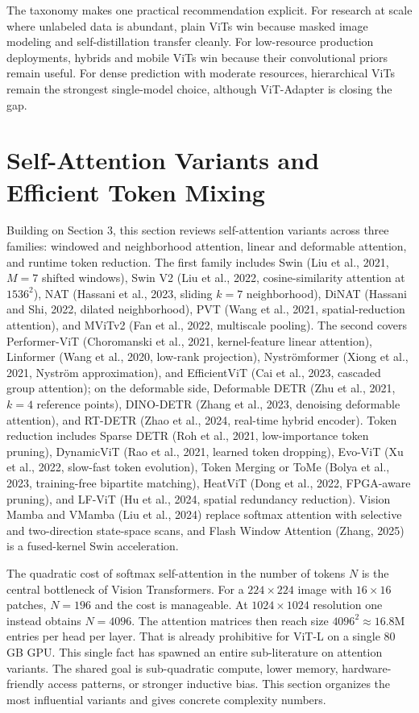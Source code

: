 \documentclass{article}
\begin{document}
The taxonomy makes one practical recommendation explicit. For research at scale where unlabeled data is abundant, plain ViTs win because masked image modeling and self-distillation transfer cleanly. For low-resource production deployments, hybrids and mobile ViTs win because their convolutional priors remain useful. For dense prediction with moderate resources, hierarchical ViTs remain the strongest single-model choice, although ViT-Adapter is closing the gap.

\section{Self-Attention Variants and Efficient Token Mixing}\label{self-attention-variants-and-efficient-token-mixing}

Building on Section 3, this section reviews self-attention variants across three families: windowed and neighborhood attention, linear and deformable attention, and runtime token reduction. The first family includes Swin (Liu et al., 2021, \(M{=}7\) shifted windows), Swin V2 (Liu et al., 2022, cosine-similarity attention at \(1536^2\)), NAT (Hassani et al., 2023, sliding \(k{=}7\) neighborhood), DiNAT (Hassani and Shi, 2022, dilated neighborhood), PVT (Wang et al., 2021, spatial-reduction attention), and MViTv2 (Fan et al., 2022, multiscale pooling). The second covers Performer-ViT (Choromanski et al., 2021, kernel-feature linear attention), Linformer (Wang et al., 2020, low-rank projection), Nyströmformer (Xiong et al., 2021, Nyström approximation), and EfficientViT (Cai et al., 2023, cascaded group attention); on the deformable side, Deformable DETR (Zhu et al., 2021, \(k{=}4\) reference points), DINO-DETR (Zhang et al., 2023, denoising deformable attention), and RT-DETR (Zhao et al., 2024, real-time hybrid encoder). Token reduction includes Sparse DETR (Roh et al., 2021, low-importance token pruning), DynamicViT (Rao et al., 2021, learned token dropping), Evo-ViT (Xu et al., 2022, slow-fast token evolution), Token Merging or ToMe (Bolya et al., 2023, training-free bipartite matching), HeatViT (Dong et al., 2022, FPGA-aware pruning), and LF-ViT (Hu et al., 2024, spatial redundancy reduction). Vision Mamba \citep{zhu2024visionmambaefficie} and VMamba (Liu et al., 2024) replace softmax attention with selective and two-direction state-space scans, and Flash Window Attention (Zhang, 2025) is a fused-kernel Swin acceleration.

The quadratic cost of softmax self-attention in the number of tokens \(N\) is the central bottleneck of Vision Transformers. For a \(224 \times 224\) image with \(16 \times 16\) patches, \(N = 196\) and the cost is manageable. At \(1024 \times 1024\) resolution one instead obtains \(N = 4096\). The attention matrices then reach size \(4096^2 \approx 16.8\)M entries per head per layer. That is already prohibitive for ViT-L on a single 80 GB GPU. This single fact has spawned an entire sub-literature on attention variants. The shared goal is sub-quadratic compute, lower memory, hardware-friendly access patterns, or stronger inductive bias. This section organizes the most influential variants and gives concrete complexity numbers.
\end{document}
